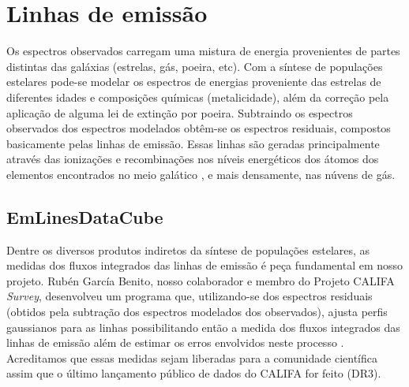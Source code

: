 


\chapter{Linhas de emissão}
\label{sec:emlines}

Os espectros observados carregam uma mistura de energia provenientes de partes distintas das
galáxias (estrelas, gás, poeira, etc). Com a síntese de populações estelares pode-se modelar os
espectros de energias proveniente das estrelas de diferentes idades e composições químicas
(metalicidade), além da correção pela aplicação de alguma lei de extinção por poeira. Subtraindo os
espectros observados dos espectros modelados obtêm-se os espectros residuais, compostos basicamente
pelas linhas de emissão. Essas linhas são geradas principalmente através das ionizações e
recombinações nos níveis energéticos dos átomos dos elementos encontrados no meio galático
 , e mais densamente, nas núvens de gás. 

\section{EmLinesDataCube}
\label{sec:emline:datacube}

Dentre os diversos produtos indiretos da síntese de populações estelares, as medidas dos fluxos
integrados das linhas de emissão é peça fundamental em nosso projeto. Rubén García Benito, nosso
colaborador e membro do Projeto CALIFA {\em Survey}, desenvolveu um programa que, utilizando-se dos
espectros residuais (obtidos pela subtração dos espectros modelados dos observados), ajusta perfis
gaussianos para as linhas possibilitando então a medida dos fluxos integrados das linhas de emissão
além de estimar os erros envolvidos neste processo . Acreditamos
que essas medidas sejam liberadas para a comunidade científica assim que o último lançamento público
de dados do CALIFA for feito (DR3).

